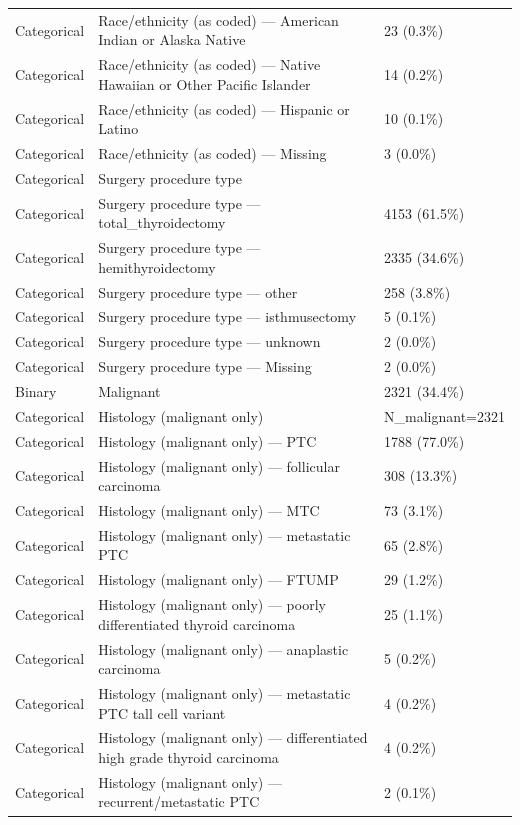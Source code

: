 \begin{table}[htbp]
\begin{tabular}{lll}
Categorical & Race/ethnicity (as coded) — American Indian or Alaska Native & 23 (0.3\%) \\
Categorical & Race/ethnicity (as coded) — Native Hawaiian or Other Pacific Islander & 14 (0.2\%) \\
Categorical & Race/ethnicity (as coded) — Hispanic or Latino & 10 (0.1\%) \\
Categorical & Race/ethnicity (as coded) — Missing & 3 (0.0\%) \\
Categorical & Surgery procedure type &  \\
Categorical & Surgery procedure type — total\_thyroidectomy & 4153 (61.5\%) \\
Categorical & Surgery procedure type — hemithyroidectomy & 2335 (34.6\%) \\
Categorical & Surgery procedure type — other & 258 (3.8\%) \\
Categorical & Surgery procedure type — isthmusectomy & 5 (0.1\%) \\
Categorical & Surgery procedure type — unknown & 2 (0.0\%) \\
Categorical & Surgery procedure type — Missing & 2 (0.0\%) \\
Binary & Malignant & 2321 (34.4\%) \\
Categorical & Histology (malignant only) & N\_malignant=2321 \\
Categorical & Histology (malignant only) — PTC & 1788 (77.0\%) \\
Categorical & Histology (malignant only) — follicular carcinoma & 308 (13.3\%) \\
Categorical & Histology (malignant only) — MTC & 73 (3.1\%) \\
Categorical & Histology (malignant only) — metastatic PTC & 65 (2.8\%) \\
Categorical & Histology (malignant only) — FTUMP & 29 (1.2\%) \\
Categorical & Histology (malignant only) — poorly differentiated thyroid carcinoma & 25 (1.1\%) \\
Categorical & Histology (malignant only) — anaplastic carcinoma & 5 (0.2\%) \\
Categorical & Histology (malignant only) — metastatic PTC tall cell variant & 4 (0.2\%) \\
Categorical & Histology (malignant only) — differentiated high grade thyroid carcinoma & 4 (0.2\%) \\
Categorical & Histology (malignant only) — recurrent/metastatic PTC & 2 (0.1\%) \\

\end{tabular}
\end{table}
